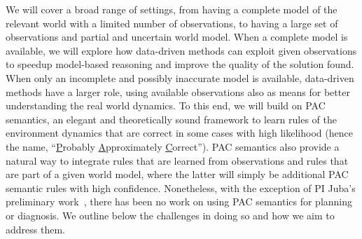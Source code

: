 \documentclass[12pt]{article}
\newcommand{\note}[1]{\textbf{\textit{#1}}}
\begin{document}



We will cover a broad range of settings, from having a complete model of the relevant world with a limited  number of observations, to having a large set of observations and partial and uncertain world model. When a complete model is available, we will explore how data-driven methods can exploit given observations to speedup model-based reasoning and
improve the quality of the solution found. 
When only an incomplete and possibly inaccurate model is available, data-driven methods have a larger role, using available observations also as means for better understanding the real world dynamics. To this end, we will build on PAC semantics, an elegant and theoretically sound framework to learn rules of the environment dynamics that are correct in some cases with high likelihood (hence the name, ``{\underline P}robably {\underline A}pproximately {\underline C}orrect''). PAC semantics also provide a natural way to integrate rules that are learned from observations and rules that are part of a given world model, where the latter will simply be  additional PAC semantic rules with high confidence. Nonetheless, with the exception of PI Juba's preliminary work~\cite{juba2016jmlr,juba2016aaai,zhang2017aaai}, there has been no work on using PAC semantics for planning or diagnosis. We outline below the challenges in doing so and how we aim to address them. 

%
\end{document}
